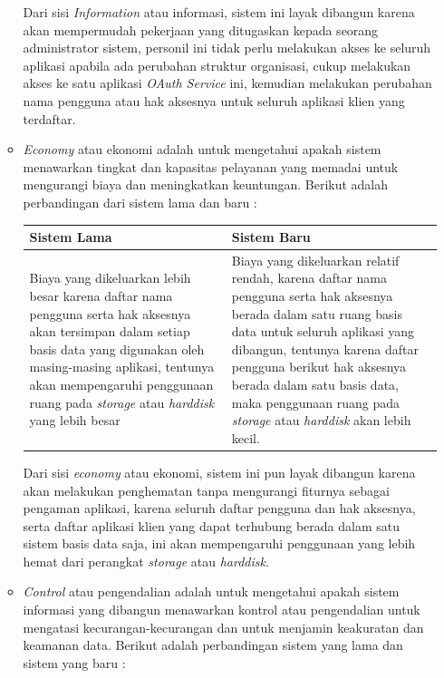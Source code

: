 \documentclass[pdftex,12pt, oneside]{article}
\begin{document}
\begin{enumerate}
\begin{itemize}
Dari sisi \textit{Information} atau informasi, sistem ini layak dibangun karena akan mempermudah pekerjaan yang ditugaskan kepada seorang administrator sistem, personil ini tidak perlu melakukan akses ke seluruh aplikasi apabila ada perubahan struktur organisasi, cukup melakukan akses ke satu aplikasi \textit{OAuth Service} ini, kemudian melakukan perubahan nama pengguna atau hak aksesnya untuk seluruh aplikasi klien yang terdaftar.

\item \textit{Economy} atau ekonomi adalah untuk mengetahui apakah sistem menawarkan tingkat dan kapasitas pelayanan yang memadai untuk mengurangi biaya dan meningkatkan keuntungan. Berikut adalah perbandingan dari sistem lama dan baru :

\begin{table}[H]	
	\centering
	\begin{tabular}{| p{7cm} | p{7cm} |}
		\hline 
		Sistem Lama & Sistem Baru \\
		\hline
		Biaya yang dikeluarkan lebih besar karena daftar nama pengguna serta hak aksesnya akan tersimpan dalam setiap basis data yang digunakan oleh masing-masing aplikasi, tentunya akan mempengaruhi penggunaan ruang pada \textit{storage} atau \textit{harddisk} yang lebih besar & Biaya yang dikeluarkan relatif rendah, karena daftar nama pengguna serta hak aksesnya berada dalam satu ruang basis data untuk seluruh aplikasi yang dibangun, tentunya karena daftar pengguna berikut hak aksesnya berada dalam satu basis data, maka penggunaan ruang pada \textit{storage} atau \textit{harddisk} akan lebih kecil. \\
		\hline		
	\end{tabular}
\end{table}

Dari sisi \textit{economy} atau ekonomi, sistem ini pun layak dibangun karena akan melakukan penghematan tanpa mengurangi fiturnya sebagai pengaman aplikasi, karena seluruh daftar pengguna dan hak aksesnya, serta daftar aplikasi klien yang dapat terhubung berada dalam satu sistem basis data saja, ini akan mempengaruhi penggunaan yang lebih hemat dari perangkat \textit{storage} atau \textit{harddisk}.

\item \textit{Control} atau pengendalian adalah untuk mengetahui apakah sistem informasi yang dibangun menawarkan kontrol atau pengendalian untuk mengatasi kecurangan-kecurangan dan untuk menjamin keakuratan dan keamanan data. Berikut adalah perbandingan sistem yang lama dan sistem yang baru :


\end{itemize}
\end{enumerate}
\end{document}
